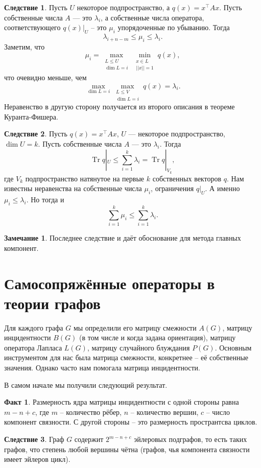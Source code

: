 \documentclass[10pt,a4paper,oneside]{book}
\theoremstyle{definition}
\newtheorem*{rem}{Замечание}
\newtheorem*{fact}{Факт}
\newtheorem{cor}{Следствие}
\newcommand{\Tr}{\operatorname{Tr}}
\def\crl{\begin{cor}}
\def\ecrl{\end{cor}}
\def\rm{\begin{rem}}
\def\erm{\end{rem}}
\def\fct{\begin{fact}}
\def\efct{\end{fact}}
\begin{document}
\crl Пусть $U$ некоторое подпространство, а $q(x)=x^{\top} Ax$. Пусть собственные числа $A$ --- это $\lambda_i$, а собственные числа оператора, соответствующего $q(x)|_U$ -- это $\mu_i$ упорядоченные по убыванию. Тогда 
$$\lambda_{i+n-m}\leq \mu_i\leq \lambda_i.$$  
\proof Заметим, что
 $$\mu_i=\max_{\substack{L\leq U\\ \dim L=i}} \min_{\substack{ x\in L \\ ||x||=1}} q(x),$$
что очевидно меньше, чем 
$$\max_{\dim L=i} \max_{\substack{L\leq V\\ \dim L=i}} q(x)=\lambda_i.$$ Неравенство в другую сторону получается из второго описания в теореме Куранта-Фишера.
\endproof
\ecrl




\crl Пусть $q(x)=x^{\top} Ax$, $U$ --- некоторое подпространство, $\dim U=k$. Пусть собственные числа $A$ --- это $\lambda_i$. Тогда $$\Tr q|_U\leq \sum_{i=1}^k \lambda_i= \Tr q|_{V_k},$$
где $V_k$ подпространство натянутое на первые $k$ собственных векторов $q$.
\proof Нам известны неравенства на собственные числа $\mu_i$, ограничения $q|_U$. А именно $\mu_i\leq \lambda_i$. Но тогда и $$\sum_{i=1}^k \mu_i \leq \sum_{i=1}^k \lambda_i.$$
\endproof
\ecrl

\rm Последнее следствие и даёт обоснование для метода главных компонент.
\erm 








\section{Самосопряжённые операторы в теории графов}

Для каждого графа $G$ мы определили его матрицу смежности $A(G)$, матрицу инцидентности $B(G)$ (в том числе и когда задана ориентация), матрицу оператора Лапласа $L(G)$, матрицу случайного блуждания $P(G)$. Основным инструментом для нас была матрица смежности, конкретнее -- её собственные значения. Однако часто нам помогала матрица инцидентности.

В самом начале мы получили следующий результат. 

\fct Размерность ядра матрицы инцидентности с одной стороны равна $m-n+c$, где $m$ -- количество рёбер, $n$ -- количество вершин, $c$ -- число компонент связности. С другой стороны -- это размерность пространтсва циклов.
\efct

\crl Граф $G$ содержит $2^{m-n+c}$ эйлеровых подграфов, то есть таких графов, что степень любой вершины чётна (графов, чья компонента связности имеет эйлеров цикл). 
\ecrl
\end{document}
